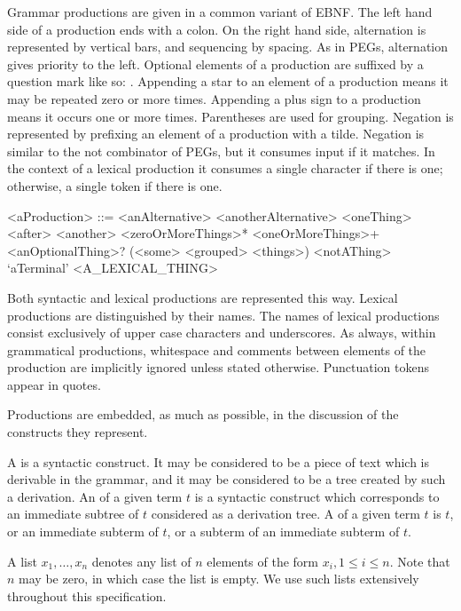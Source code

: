 \documentclass[makeidx]{article}
\begin{document}
\LMHash{}%
Grammar productions are given in a common variant of EBNF.
The left hand side of a production ends with a colon.
On the right hand side, alternation is represented by vertical bars, and sequencing by spacing.
As in PEGs, alternation gives priority to the left.
Optional elements of a production are suffixed by a question mark like so: .
Appending a star to an element of a production means it may be repeated zero or more times.
Appending a plus sign to a production means it occurs one or more times.
Parentheses are used for grouping.
Negation is represented by prefixing an element of a production with a tilde.
Negation is similar to the not combinator of PEGs, but it consumes input if it matches.
In the context of a lexical production it consumes a single character if there is one; otherwise, a single token if there is one.


\begin{grammar}\color{commentaryColor}
<aProduction> ::= <anAlternative>
  \alt <anotherAlternative>
  \alt <oneThing> <after> <another>
  \alt <zeroOrMoreThings>*
  \alt <oneOrMoreThings>+
  \alt <anOptionalThing>?
  \alt (<some> <grouped> <things>)
  \alt \gtilde{}<notAThing>
  \alt `aTerminal'
  \alt <A\_LEXICAL\_THING>
\end{grammar}

\LMHash{}%
Both syntactic and lexical productions are represented this way.
Lexical productions are distinguished by their names.
The names of lexical productions consist exclusively of upper case characters and underscores.
As always, within grammatical productions, whitespace and comments between elements of the production are implicitly ignored unless stated otherwise.
Punctuation tokens appear in quotes.

\LMHash{}%
Productions are embedded, as much as possible, in the discussion of the constructs they represent.

\LMHash{}%
A  is a syntactic construct.
It may be considered to be a piece of text which is derivable in the grammar,
and it may be considered to be a tree created by such a derivation.
An  of a given term $t$ is a syntactic construct
which corresponds to an immediate subtree of $t$ considered as a derivation tree.
A  of a given term $t$ is $t$,
or an immediate subterm of $t$,
or a subterm of an immediate subterm of $t$.

\LMHash{}%
A list $x_1, \ldots, x_n$ denotes any list of $n$ elements of the form $x_i, 1 \le i \le n$.
Note that $n$ may be zero, in which case the list is empty.
We use such lists extensively throughout this specification.
\end{document}
